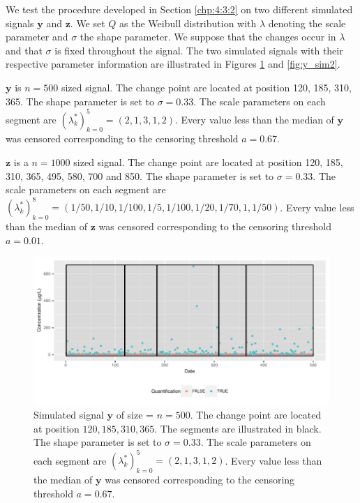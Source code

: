 We test the procedure developed in Section \ref{chp:4:3:2} on two different simulated signals $\bm y$ and $\bm z$. We set $Q$ as the Weibull distribution with $\lambda$ denoting the scale parameter and $\sigma$ the shape parameter. We suppose that the changes occur in $\lambda$ and that $\sigma$ is fixed throughout the signal. The two simulated signals with their respective parameter information are illustrated in Figures \ref{fig:y_sim1} and \ref{fig:y_sim2}. 

$\bm y$ is $n = 500$ sized signal. The change point are located at position 120, 185, 310, 365. The shape parameter is set to $\sigma = 0.33$. The scale parameters on each segment are $(\lambda^*_k)_{k = 0}^5 = (2,1,3,1,2)$. Every value less than the median of $\bm y$ was censored corresponding to the censoring threshold $a = 0.67$.

$\bm z$ is a $n = 1000$ sized signal. The change point are located at position 120, 185, 310, 365, 495, 580, 700 and 850. The shape parameter is set to $\sigma = 0.33$. The scale parameters on each segment are $(\lambda^*_k)_{k = 0}^8 = (1/50, 1/10, 1/100, 1/5, 1/100, 1/20, 1/70,1, 1/50)$. Every value less than the median of $\bm z$ was censored corresponding to the censoring threshold $a = 0.01$.

\begin{figure}[htbp]
    \centering
    \includegraphics{figs/Chap4/y_sim1.pdf}
    \caption{Simulated signal $\bm y$ of size = $n = 500$. The change point are located at position $120,185,310,365$. The segments are illustrated in black. The shape parameter is set to $\sigma = 0.33$. The scale parameters on each segment are $(\lambda^*_k)_{k = 0}^5 = (2,1,3,1,2)$. Every value less than the median of $\bm y$ was censored corresponding to the censoring threshold $a = 0.67$.}
    \label{fig:y_sim1}
\end{figure}

